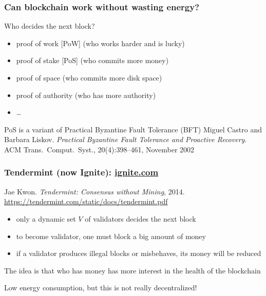 \documentclass[11pt]{beamer}  %
\begin{document}
\begin{frame}
  \frametitle{Can blockchain work without wasting energy?}

  \begin{center}
    Who decides the next block?
  \end{center}

  \bigskip

  \begin{greenbox}{}
    \begin{itemize}
    \item proof of work [PoW] (who works harder and is lucky)
    \item proof of stake [PoS] (who commits more money)
    \item proof of space (who commits more disk space)
    \item proof of authority (who has more authority)
    \item \ldots
    \end{itemize}
  \end{greenbox}

  \bigskip

  \begin{greenbox}{PoS is a variant of Practical Byzantine Fault Tolerance (BFT)}
    Miguel Castro and Barbara Liskov.
    \emph{Practical Byzantine Fault Tolerance and Proactive Recovery}.
    ACM Trans.\ Comput.\ Syst., 20(4):398–461, November 2002
  \end{greenbox}

\end{frame}

\begin{frame}\frametitle{Tendermint (now Ignite): \url{ignite.com}}

  \begin{greenbox}{Jae Kwon. \emph{Tendermint: Consensus without Mining}, 2014.\\
    \url{https://tendermint.com/static/docs/tendermint.pdf}}
    \begin{itemize}
    \item only a dynamic set $V$ of validators decides the next block
    \item to become validator, one must block a big amount of money
    \item if a validator produces illegal blocks or misbehaves, its money will be reduced
    \end{itemize}
  \end{greenbox}

  \smallskip

  \begin{center}
    The idea is that who has money has more interest in the health of the blockchain
  \end{center}

  \smallskip

  \begin{center}
    Low energy consumption, but this is not really decentralized!
  \end{center}

\end{frame}
\end{document}
